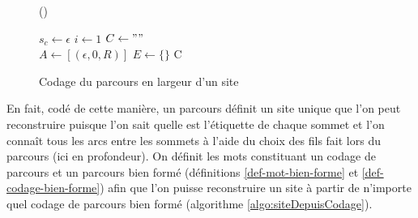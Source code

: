 \begin{figure}[h]
\begin{algorithm}[H]
\caption{Codage du parcours en largeur d'un site}
\SetAlgoLined
{}
\Fn(){}{

}
$s_c\leftarrow \epsilon$
$i\leftarrow 1$
$C\leftarrow ""$\\
$A\leftarrow [(\epsilon, 0, R)]$
$E\leftarrow \{\}$
\Return C
\label{algo:codageLarg}
\end{algorithm}
\end{figure}


\FloatBarrier
En fait, codé de cette manière, un parcours définit un site unique que l'on peut reconstruire puisque l'on sait quelle est l'étiquette de chaque sommet et l'on connaît tous les arcs entre les sommets à l'aide du choix des fils fait lors du parcours (ici en profondeur).
On définit les mots constituant un codage de parcours et un parcours bien formé (définitions \ref{def-mot-bien-forme} et \ref{def-codage-bien-forme}) afin que l'on puisse reconstruire un site à partir de n'importe quel codage de parcours bien formé (algorithme \ref{algo:siteDepuisCodage}).


